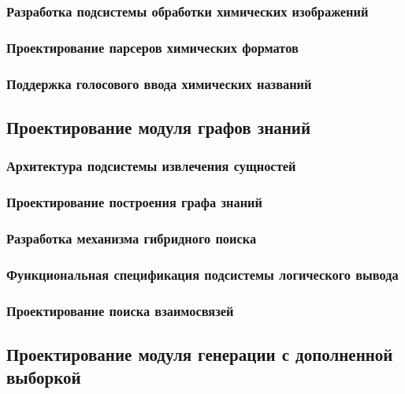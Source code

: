 \documentclass{syksu-coursework}
\begin{document}
\subsubsection{Разработка подсистемы обработки химических изображений}

\subsubsection{Проектирование парсеров химических форматов}

\subsubsection{Поддержка голосового ввода химических названий}

\subsection{Проектирование модуля графов знаний}

\subsubsection{Архитектура подсистемы извлечения сущностей}

\subsubsection{Проектирование построения графа знаний}

\subsubsection{Разработка механизма гибридного поиска}

\subsubsection{Функциональная спецификация подсистемы логического вывода}

\subsubsection{Проектирование поиска взаимосвязей}

\subsection{Проектирование модуля генерации с дополненной выборкой}
\end{document}
